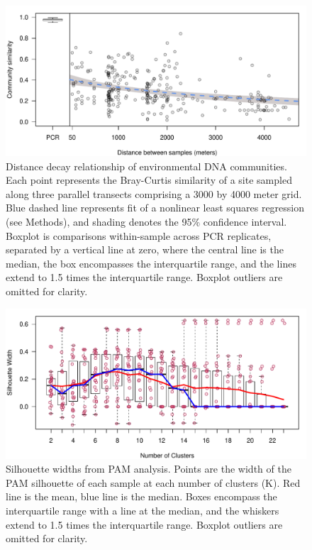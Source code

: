 \documentclass[11pt,letterpaper]{article} %
\begin{document}
\newpage
\begin{figure}[H] %
  \centering
    \includegraphics[width=1\textwidth]{distance_decay.pdf}
    \caption{
		Distance decay relationship of environmental DNA communities.
		Each point represents the Bray-Curtis similarity of a site sampled along three parallel transects comprising a 3000 by 4000 meter grid. Blue dashed line represents fit of a nonlinear least squares regression (see Methods), and shading denotes the 95\% confidence interval. Boxplot is comparisons within-sample across PCR replicates, separated by a vertical line at zero, where the central line is the median, the box encompasses the interquartile range, and the lines extend to 1.5 times the interquartile range. Boxplot outliers are omitted for clarity.
		}
  \label{distance_decay}
\end{figure}

\begin{figure}[H] %
  \centering
    \includegraphics[width=1\textwidth]{pam_sil.pdf}
    \caption{
		Silhouette widths from PAM analysis.
		Points are the width of the PAM silhouette of each sample at each number of clusters (K). Red line is the mean, blue line is the median. Boxes encompass the interquartile range with a line at the median, and the whiskers extend to 1.5 times the interquartile range. Boxplot outliers are omitted for clarity.
		}
		\label{pam_sil}
\end{figure}
\end{document}
